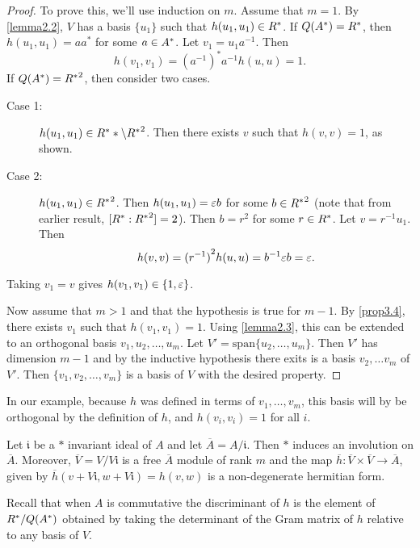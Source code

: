 \begin{proof}
To prove this, we'll use induction on $m$.
Assume that $m = 1$. By \cref{lemma2.2}, $V$ has a basis $\{u_1\}$ such that $h(u_1, u_1) \in R^*$.
If $Q(A^*) = R^*$, then $h(u_1, u_1) = a a^*$ for some $a \in A^*$.
Let $v_1 = u_1 a^{-1}$.
Then
\[
h(v_1, v_1) = (a^{-1})^* a^{-1} h(u, u) = 1.
\]
If $Q(A^*) = {R^*}^2$, then consider two cases.
\begin{description}
\item[Case 1:] $h(u_1, u_1) \in R^** \backslash {R^*}^2$.
Then there exists $v$ such that $h(v,v) = 1$, as shown.
\item[Case 2:] $h(u_1, u_1) \in {R^*}^2$.
Then $h(u_1, u_1) = \varepsilon b$ for some $b \in {R^*}^2$ (note that from earlier result, $[R^* : {R^*}^2] = 2$).
Then $b = r^2$ for some $r \in R^*$.
Let $v = r^{-1} u_1$. Then
\[
h(v, v) = {(r^{-1})}^2 h(u, u) = b^{-1} \varepsilon b = \varepsilon.
\]
\end{description}
Taking $v_1 = v$ gives $h(v_1, v_1) \in \{1, \varepsilon\}$.

Now assume that $m > 1$ and that the hypothesis is true for $m - 1$.
By \cref{prop3.4}, there exists $v_1$ such that $h(v_1, v_1) = 1$.
Using \cref{lemma2.3}, this can be extended to an orthogonal basis $v_1, u_2, \dotsc, u_m$.
Let $V' = \text{span} \{u_2, \dotsc, u_m \}$.
Then $V'$ has dimension $m - 1$ and by the inductive hypothesis there exits is a basis $v_2, \dotsc v_m$ of $V'$.
Then $\{v_1, v_2, \dotsc, v_m \}$ is a basis of $V$ with the desired property.
\end{proof}

\begin{example}\label{ex3.3}
In our example, because $h$ was defined in terms of $v_1, \dotsc, v_m$, this basis will by be orthogonal by the definition of $h$,
and $h(v_i, v_i) = 1$ for all $i$.
\end{example}

Let $\mathfrak{i}$ be a $*$ invariant ideal of $A$ and let $\overline{A} = A / \mathfrak{i}$.
Then $*$ induces an involution on $\overline{A}$.
Moreover, $\overline{V} = V / V \mathfrak{i}$ is a free $\overline{A}$ module of rank $m$ and the map $\overline{h}: \overline{V} \times \overline{V} \to \overline{A}$,
given by $\overline{h}(v + V \mathfrak{i}, w + V \mathfrak{i}) = h(v, w)$ is a non-degenerate hermitian form.

Recall that when $A$ is commutative the discriminant of $h$ is the element of $R^* / Q(A^*)$ obtained by taking the determinant of the Gram matrix of $h$ relative to any basis of $V$.

